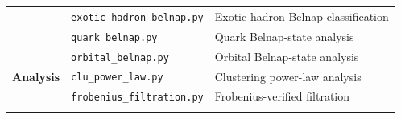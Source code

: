 \documentclass[12pt,a4paper]{article}
\begin{document}
\begin{longtable}[]{@{}lll@{}}
\begin{minipage}[t]{0.23\columnwidth}
\strut
\end{minipage} & \begin{minipage}[t]{0.26\columnwidth}\raggedright
\texttt{exotic\_hadron\_belnap.py}\strut
\end{minipage} & \begin{minipage}[t]{0.42\columnwidth}\raggedright
Exotic hadron Belnap classification\strut
\end{minipage}\tabularnewline
\begin{minipage}[t]{0.23\columnwidth}\raggedright
\strut
\end{minipage} & \begin{minipage}[t]{0.26\columnwidth}\raggedright
\texttt{quark\_belnap.py}\strut
\end{minipage} & \begin{minipage}[t]{0.42\columnwidth}\raggedright
Quark Belnap-state analysis\strut
\end{minipage}\tabularnewline
\begin{minipage}[t]{0.23\columnwidth}\raggedright
\strut
\end{minipage} & \begin{minipage}[t]{0.26\columnwidth}\raggedright
\texttt{orbital\_belnap.py}\strut
\end{minipage} & \begin{minipage}[t]{0.42\columnwidth}\raggedright
Orbital Belnap-state analysis\strut
\end{minipage}\tabularnewline
\begin{minipage}[t]{0.23\columnwidth}\raggedright
\textbf{Analysis}\strut
\end{minipage} & \begin{minipage}[t]{0.26\columnwidth}\raggedright
\texttt{clu\_power\_law.py}\strut
\end{minipage} & \begin{minipage}[t]{0.42\columnwidth}\raggedright
Clustering power-law analysis\strut
\end{minipage}\tabularnewline
\begin{minipage}[t]{0.23\columnwidth}\raggedright
\strut
\end{minipage} & \begin{minipage}[t]{0.26\columnwidth}\raggedright
\texttt{frobenius\_filtration.py}\strut
\end{minipage} & \begin{minipage}[t]{0.42\columnwidth}\raggedright
Frobenius-verified filtration\strut
\end{minipage}\tabularnewline
\begin{minipage}[t]{0.23\columnwidth}\raggedright

\end{minipage}
\end{longtable}
\end{document}
